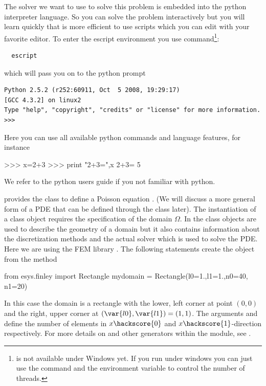 The \escript solver we want to use to solve this problem is embedded into the python interpreter language. So you can solve the problem interactively but you will learn quickly 
that is more efficient to use scripts which you can edit with your favorite editor. 
To enter the escript environment you use  command\footnote{ is not available under Windows yet. If you run under windows you can just use the
 command and the  environment variable to control the number
of threads.}:
\begin{verbatim}
  escript
\end{verbatim}
which will pass you on to the python prompt
\begin{verbatim}
Python 2.5.2 (r252:60911, Oct  5 2008, 19:29:17) 
[GCC 4.3.2] on linux2
Type "help", "copyright", "credits" or "license" for more information.
>>> 
\end{verbatim}
Here you can use all available python commands and language features, for instance
\begin{python}
 >>> x=2+3
>>> print "2+3=",x
2+3= 5
\end{python}
We refer to the python users guide if you not familiar with python.

\escript provides the class \Poisson to define a Poisson equation .
(We will discuss a more general form of a PDE  
that can be defined through the \LinearPDE class later). The instantiation of
a \Poisson class object requires the specification of the domain $\Omega$. In \escript
the \Domain class objects are used to describe the geometry of a domain but it also
contains information about the discretization methods and the actual solver which is used
to solve the PDE. Here we are using the FEM library \finley {}. The following statements create the \Domain object  from the 
\finley method 
\begin{python}
  from esys.finley import Rectangle
  mydomain = Rectangle(l0=1.,l1=1.,n0=40, n1=20)
\end{python}
In this case the domain is a rectangle with the lower, left corner at point $(0,0)$ and
the right, upper corner at $(\var{l0},\var{l1})=(1,1)$.
The arguments  and  define the number of elements in $x\hackscore{0}$ and
$x\hackscore{1}$-direction respectively. For more details on  and
other \Domain generators within the \finley module,
see .

